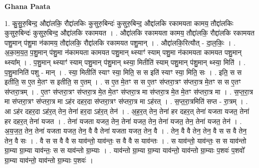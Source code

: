 \documentclass[17pt]{extarticle}
\begin{document}
\textbf{Ghana Paata } \newline

1. कु॒सु॒रु॒बिन्द॒ औद्दा॑लकि॒ रौद्दा॑लकिः कुसुरु॒बिन्दः॑ कुसुरु॒बिन्द॒ औद्दा॑लकि रकामयता कामय॒ तौद्दा॑लकिः कुसुरु॒बिन्दः॑ कुसुरु॒बिन्द॒ औद्दा॑लकि रकामयत । . औद्दा॑लकि रकामयता कामय॒ तौद्दा॑लकि॒ रौद्दा॑लकि रकामयत पशु॒मान् प॑शु॒मा न॑कामय॒ तौद्दा॑लकि॒ रौद्दा॑लकि रकामयत पशु॒मान् । . औद्दा॑लकि॒रित्यौत् - दा॒ल॒किः॒ । . अ॒का॒म॒य॒त॒ प॒शु॒मान् प॑शु॒मा न॑कामयता कामयत पशु॒मान् थ्स्याꣳ॑ स्याम् पशु॒मा न॑कामयता कामयत पशु॒मान् थ्स्या᳚म् । . प॒शु॒मान् थ्स्याꣳ॑ स्याम् पशु॒मान् प॑शु॒मान् थ्स्या॒ मितीति॑ स्याम् पशु॒मान् प॑शु॒मान् थ्स्या॒ मिति॑ । . प॒शु॒मानिति॑ पशु - मान् । . स्या॒ मितीति॑ स्याꣳ स्या॒ मिति॒ स स इति॑ स्याꣳ स्या॒ मिति॒ सः । . इति॒ स स इतीति॒ स ए॒त मे॒तꣳ स इतीति॒ स ए॒तम् । . स ए॒त मे॒तꣳ स स ए॒तꣳ स॑प्तरा॒त्रꣳ स॑प्तरा॒त्र मे॒तꣳ स स ए॒तꣳ स॑प्तरा॒त्रम् । . ए॒तꣳ स॑प्तरा॒त्रꣳ स॑प्तरा॒त्र मे॒त मे॒तꣳ स॑प्तरा॒त्र मा स॑प्तरा॒त्र मे॒त मे॒तꣳ स॑प्तरा॒त्र मा । . स॒प्त॒रा॒त्र मा स॑प्तरा॒त्रꣳ स॑प्तरा॒त्र मा ऽह॑र दहर॒दा स॑प्तरा॒त्रꣳ स॑प्तरा॒त्र मा ऽह॑रत् । . स॒प्त॒रा॒त्रमिति॑ सप्त - रा॒त्रम् । . आ ऽह॑र दहर॒दा ऽह॑र॒त् तेन॒ तेना॑ हर॒दा ऽह॑र॒त् तेन॑ । . अ॒ह॒र॒त् तेन॒ तेना॑ हर दहर॒त् तेना॑ यजता यजत॒ तेना॑ हर दहर॒त् तेना॑ यजत । . तेना॑ यजता यजत॒ तेन॒ तेना॑ यजत॒ तेन॒ तेना॑ यजत॒ तेन॒ तेना॑ यजत॒ तेन॑ । . अ॒य॒ज॒त॒ तेन॒ तेना॑ यजता यजत॒ तेन॒ वै वै तेना॑ यजता यजत॒ तेन॒ वै । . तेन॒ वै वै तेन॒ तेन॒ वै स स वै तेन॒ तेन॒ वै सः । . वै स स वै वै स याव॑न्तो॒ याव॑न्तः॒ स वै वै स याव॑न्तः । . स याव॑न्तो॒ याव॑न्तः॒ स स याव॑न्तो ग्रा॒म्या ग्रा॒म्या याव॑न्तः॒ स स याव॑न्तो ग्रा॒म्याः । . याव॑न्तो ग्रा॒म्या ग्रा॒म्या याव॑न्तो॒ याव॑न्तो ग्रा॒म्याः प॒शवः॑ प॒शवो᳚ ग्रा॒म्या याव॑न्तो॒ याव॑न्तो ग्रा॒म्याः प॒शवः॑ । \newline
\end{document}
